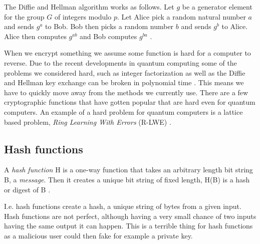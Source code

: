 \begin{definition}

    The Diffie and Hellman algorithm works as follows. Let $g$ be a generator
    element for the group $G$ of integers modulo $p$. Let Alice pick a random
    natural number $a$ and sends $g^a$ to Bob. Bob then picks a random number
    $b$ and sends $g^b$ to Alice. Alice then computes $g^{ab}$ and Bob computes
    $g^{ba}$ \citep{FranciscoRodriguez-Henriquez10}.

\end{definition}

When we encrypt something we assume some function is hard for a computer to
reverse. Due to the recent developments in quantum computing some of the
problems we considered hard, such as integer factorization as well as the
Diffie and Hellman key exchange can be broken in polynomial time
\citep{FPGA_Post_Quantum_Primitives}.
This means we have to quickly move away from the methods we currently use.
There are a few cryptographic functions that have gotten popular that are hard
even for quantum computers. An example of a hard problem for quantum computers
is a lattice based problem, \textit{Ring Learning With Errors} (R-LWE)
\citep{FPGA_Post_Quantum_Primitives}.

\subsection{Hash functions}
\begin{definition}

A \textit{hash function} H is a one-way function that takes an arbitrary length
bit string B, a \textit{message}. Then it creates a unique bit string of fixed
length, H(B) is a hash or digest of B \cite{FranciscoRodriguez-Henriquez10}.

\end{definition}

I.e. hash functions create a hash, a unique string of bytes from a given input.
Hash functions are not perfect, although having a very small chance of two
inputs having the same output it can happen. This is a terrible thing for hash
functions as a malicious user could then fake for example a private key.


